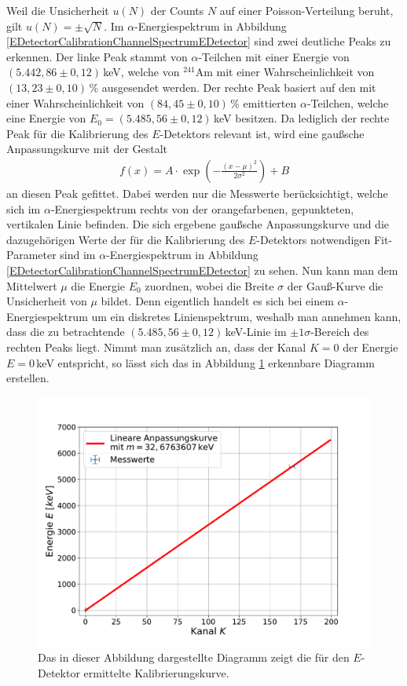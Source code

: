 Weil die Unsicherheit $u(N)$ der Counts $N$ auf einer Poisson-Verteilung beruht, gilt $u(N)=\pm\sqrt{N}$.
Im $\alpha$-Energiespektrum in Abbildung \ref{EDetectorCalibrationChannelSpectrumEDetector} sind zwei deutliche Peaks zu erkennen.
Der linke Peak stammt von $\alpha$-Teilchen mit einer Energie von $(5.442,86\pm 0,12)\,$keV, welche von $^{241}$Am mit einer Wahrscheinlichkeit von $(13,23\pm 0,10)\,$\% ausgesendet werden.
Der rechte Peak basiert auf den mit einer Wahrscheinlichkeit von $(84,45\pm 0,10)\,$\% emittierten $\alpha$-Teilchen, welche eine Energie von $E_{0}=(5.485,56\pm 0,12)\,$keV besitzen.
Da lediglich der rechte Peak für die Kalibrierung des $E$-Detektors relevant ist, wird eine gaußsche Anpassungskurve mit der Gestalt
\begin{align} \label{Gaussian}
f(x)=A\cdot\exp\left( -\frac{(x-\mu)^2}{2\sigma ^2}\right) + B
\end{align}
\noindent an diesen Peak gefittet.
Dabei werden nur die Messwerte berücksichtigt, welche sich im $\alpha$-Energiespektrum rechts von der orangefarbenen, gepunkteten, vertikalen Linie befinden.
Die sich ergebene gaußsche Anpassungskurve und die dazugehörigen Werte der für die Kalibrierung des $E$-Detektors notwendigen Fit-Parameter sind im $\alpha$-Energiespektrum in Abbildung \ref{EDetectorCalibrationChannelSpectrumEDetector} zu sehen.
Nun kann man dem Mittelwert $\mu$ die Energie $E_{0}$ zuordnen, wobei die Breite $\sigma$ der Gauß-Kurve die Unsicherheit von $\mu$ bildet.
Denn eigentlich handelt es sich bei einem $\alpha$-Energiespektrum um ein diskretes Linienspektrum, weshalb man annehmen kann, dass die zu betrachtende $(5.485,56\pm 0,12)\,$keV-Linie im $\pm 1\sigma$-Bereich des rechten Peaks liegt.
Nimmt man zusätzlich an, dass der Kanal $K=0$ der Energie $E=0\,$keV entspricht, so lässt sich das in Abbildung \ref{EDetectorCalibration} erkennbare Diagramm erstellen.
\begin{figure}[H]
	\centering
	\includegraphics[width=1.0\textwidth]{src/EDetectorCalibration}
	\caption{Das in dieser Abbildung dargestellte Diagramm zeigt die für den $E$-Detektor ermittelte Kalibrierungskurve.}
	\label{EDetectorCalibration}
\end{figure}
